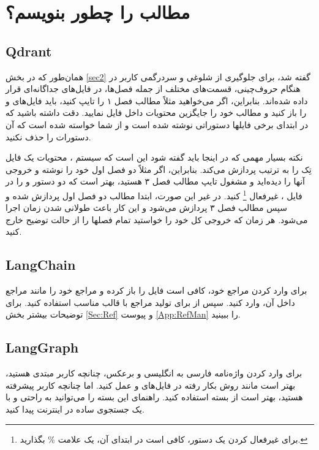 \section[ابزار‌ها و فریم‌ورک‌ها]
{مطالب \پ را چطور بنویسم؟}
\subsection{Qdrant}
همان‌طور که در بخش \ref{sec2} گفته شد، برای جلوگیری از شلوغی و سردرگمی کاربر در هنگام حروف‌چینی، قسمت‌های مختلف \پ از جمله فصل‌ها، در فایل‌های جداگانه‌ای قرار داده شده‌اند. 
بنابراین، اگر می‌خواهید مثلاً مطالب فصل ۱ را تایپ کنید، باید فایل‌های 
و
را باز کنید و مطالب خود را جایگزین محتویات داخل فایل 
نمایید. دقت داشته باشید که در ابتدای برخی فایلها دستوراتی نوشته شده است و از شما خواسته شده است که آن دستورات را حذف نکنید.


نکته بسیار مهمی که در اینجا باید گفته شود این است که سیستم \lr{\TeX}، محتویات یک فایل تِک را به ترتیب پردازش می‌کند.  بنابراین، اگر مثلاً  دو فصل اول خود را نوشته و خروجی آنها را دیده‌اید و مشغول تایپ مطالب فصل ۳ هستید، بهتر است
که دو دستور 
\verb!!
و
\verb!!
را در فایل 
،
غیرفعال%
\footnote{
برای غیرفعال کردن یک دستور، کافی است در ابتدای آن، یک علامت
\%
 بگذارید.
}
 کنید.  در غیر این صورت، ابتدا مطالب دو فصل اول  پردازش شده و سپس مطالب فصل ۳ پردازش می‌شود و این کار باعث طولانی شدن زمان اجرا می‌شود. هر زمان که خروجی کل \پ خود را خواستید تمام فصلها را از حالت توضیح خارج کنید.

\subsection{LangChain}
برای وارد کردن مراجع \پ خود، کافی است فایل 
را باز کرده و مراجع خود را مانند مراجع داخل آن، وارد کنید.  سپس از  برای تولید مراجع با قالب مناسب استفاده کنید. برای توضیحات بیشتر بخش \ref{Sec:Ref} و پیوست \ref{App:RefMan} را ببینید.


\subsection{LangGraph}
برای وارد کردن واژه‌نامه فارسی به انگلیسی و برعکس، چنانچه کاربر مبتدی هستید، بهتر است مانند روش بکار رفته در فایل‌های 
و
عمل کنید. اما چنانچه کاربر پیشرفته هستید، بهتر است از بسته
استفاده کنید. راهنمای این بسته را می‌توانید به راحتی و با یک جستجوی ساده در اینترنت پیدا کنید.
